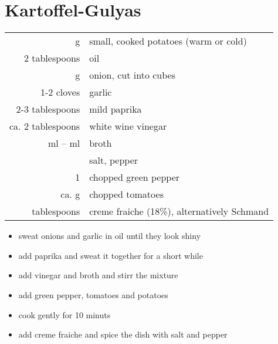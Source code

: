 \section*{Kartoffel-Gulyas}

\begin{tabular}{rl}
 \unit[750]{g}     & small, cooked potatoes (warm or cold)\\
 2 tablespoons     & oil\\
 \unit[250]{g}     & onion, cut into cubes\\
 1-2 cloves        & garlic\\
 2-3 tablespoons   & mild paprika\\
 ca. 2 tablespoons & white wine vinegar\\
 \unit[150]{ml} -- \unit[200]{ml} & broth\\
                   & salt, pepper\\
 1                 & chopped green pepper\\
 ca. \unit[400]{g} & chopped tomatoes\\
 \unit[2--4]{tablespoons} & creme fraiche (18\%), alternatively Schmand
\end{tabular}

\vspace{1cm}

\begin{itemize}
 \item sweat onions and garlic in oil until they look shiny
 \item add paprika and sweat it together for a short while
 \item add vinegar and broth and stirr the mixture
 \item add green pepper, tomatoes and potatoes
 \item cook gently for 10 minuts
 \item add creme fraiche and spice the dish with salt and pepper
\end{itemize}
